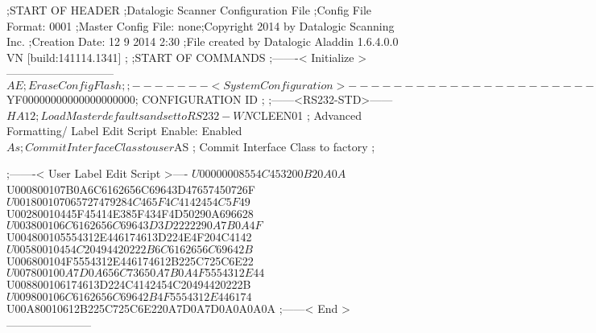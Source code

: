 ;START OF HEADER
;Datalogic Scanner Configuration File
;Config File Format: 0001
;Master Config File: none;Copyright 2014 by Datalogic Scanning Inc.
;Creation Date: 12 9 2014 2:30
;File created by Datalogic Aladdin 1.6.4.0.0 VN [build:141114.1341]
;
;START OF COMMANDS
;-------< Initialize >-----------------------------
$AE                 ; Erase Config Flash
;
;-------< System Configuration >-------------------------------
$YF00000000000000000000; CONFIGURATION ID
;
;------<RS232-STD>------
$HA12               ; Load Master defaults and set to RS232-WN
$CLEEN01            ; Advanced Formatting/ Label Edit Script Enable: Enabled
$As                 ; Commit Interface Class to user
$AS                 ; Commit Interface Class to factory
;

;-------< User Label Edit Script >----
$U00000008554C453200B20A0A
$U000800107B0A6C6162656C69643D47657450726F
$U001800107065727479284C465F4C4142454C5F49
$U00280010445F45414E385F434F4D50290A696628
$U003800106C6162656C69643D3D2222290A7B0A4F
$U004800105554312E446174613D224E4F204C4142
$U00580010454C20494420222B6C6162656C69642B
$U006800104F5554312E446174612B225C725C6E22
$U007800100A7D0A656C73650A7B0A4F5554312E44
$U008800106174613D224C4142454C20494420222B
$U009800106C6162656C69642B4F5554312E446174
$U00A80010612B225C725C6E220A7D0A7D0A0A0A0A
;------< End >-----------------------
